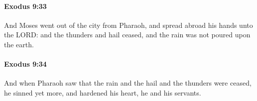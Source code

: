 		\paragraph{Exodus 9:33} %
			\label{EXODUS-9-33}

			And Moses went out of the city from Pharaoh, and spread abroad his hands unto the LORD: and the thunders and hail ceased, and the rain was not poured upon the earth.


		\paragraph{Exodus 9:34} %
			\label{EXODUS-9-34}

			And when Pharaoh saw that the rain and the hail and the thunders were ceased, he sinned yet more, and hardened his heart, he and his servants.


